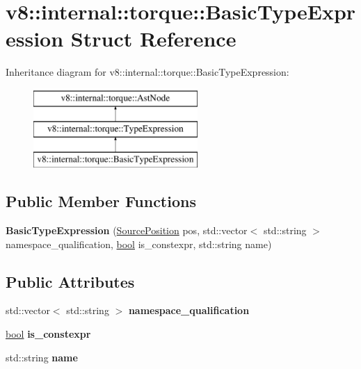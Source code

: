 \hypertarget{structv8_1_1internal_1_1torque_1_1BasicTypeExpression}{}\section{v8\+:\+:internal\+:\+:torque\+:\+:Basic\+Type\+Expression Struct Reference}
\label{structv8_1_1internal_1_1torque_1_1BasicTypeExpression}
Inheritance diagram for v8\+:\+:internal\+:\+:torque\+:\+:Basic\+Type\+Expression\+:\begin{figure}[H]
\begin{center}
\leavevmode
\includegraphics[height=3.000000cm]{structv8_1_1internal_1_1torque_1_1BasicTypeExpression}
\end{center}
\end{figure}
\subsection*{Public Member Functions}
\begin{DoxyCompactItemize}
\item 
\mbox{\label{structv8_1_1internal_1_1torque_1_1BasicTypeExpression_aace5089c9ba84edf263acfe667fa5a79}} 
{\bfseries Basic\+Type\+Expression} (\mbox{\hyperlink{structv8_1_1internal_1_1torque_1_1SourcePosition}{Source\+Position}} pos, std\+::vector$<$ std\+::string $>$ namespace\+\_\+qualification, \mbox{\hyperlink{classbool}{bool}} is\+\_\+constexpr, std\+::string name)
\end{DoxyCompactItemize}
\subsection*{Public Attributes}
\begin{DoxyCompactItemize}
\item 
\mbox{\label{structv8_1_1internal_1_1torque_1_1BasicTypeExpression_ae128dbbab3b24962b4eac34dc6d33769}} 
std\+::vector$<$ std\+::string $>$ {\bfseries namespace\+\_\+qualification}
\item 
\mbox{\label{structv8_1_1internal_1_1torque_1_1BasicTypeExpression_affae903778d705c5022e1e265cb71e3c}} 
\mbox{\hyperlink{classbool}{bool}} {\bfseries is\+\_\+constexpr}
\item 
\mbox{\label{structv8_1_1internal_1_1torque_1_1BasicTypeExpression_aec8692c6dc1dfd66824efaed7a6de339}} 
std\+::string {\bfseries name}
\end{DoxyCompactItemize}
